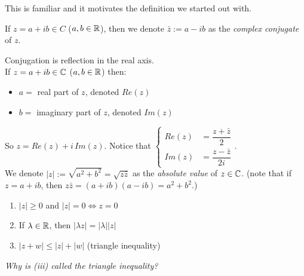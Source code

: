 \documentclass[twoside]{scrartcl}
\begin{document}
This is familiar and it motivates the definition we started out with. 


If   $z = a + ib \in C$ ($a,b \in\mathbb{R}$), then we denote $\bar{z} := a-ib$ as the \emph{complex conjugate} of $z$.

\begin{center}
\end{center}

Conjugation is reflection in the real axis.\\

If $z = a + ib \in\mathbb{C}$ ($a,b \in\mathbb{R}$) then: 
\begin{itemize}
\item $a =$ real part of $z$, denoted $Re(z)$
\item $b = $ imaginary part of $z$, denoted $Im(z)$	
\end{itemize}\vspace*{5pt}

So $z = Re(z) + i\,Im(z)$. Notice that $\begin{cases}
Re(z) &= \dfrac{z + \bar{z}}{2}\\[0.5cm]
Im(z) &= \dfrac{z-\bar{z}}{2i}
\end{cases}$.\\

We denote $|z|:= \sqrt{a^2 + b^2} = \sqrt{z\bar{z}}$ as the \emph{absolute value} of $z\in\mathbb{C}$. (note that if $z = a +ib$, then $z\bar{z} = (a+ib)(a-ib) = a^2+b^2$.)


\begin{enumerate}
\item $|z| \geq 0$ and $|z| = 0 \iff z = 0$
\item If $\lambda \in\mathbb{R}$, then $|\lambda z| = |\lambda||z|$
\item $|z+w| \leq |z| + |w|$ (triangle inequality)	
\end{enumerate}

\emph{Why is (iii) called the triangle inequality?}
\end{document}
